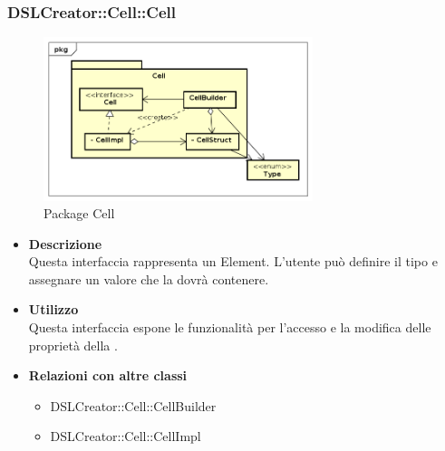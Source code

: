  \subsubsection{DSLCreator::Cell::Cell}
                 \begin{figure}[H]
                  \centering
                  \includegraphics[width=0.7\textwidth]{res/img/Cell.png}
                  \caption{Package Cell}
                  \label{fig:diagram_model}
                \end{figure}
                    \begin{itemize}
                        \item \textbf{Descrizione} \hfill \\
                            Questa interfaccia rappresenta un  Element. L'utente può definire il tipo e assegnare un valore che la  dovrà contenere.
                        \item \textbf{Utilizzo} \hfill \\
                            Questa interfaccia espone le funzionalità per l'accesso e la modifica delle proprietà della .
                        \item \textbf{Relazioni con altre classi}
                            \begin{itemize}
                              \item DSLCreator::Cell::CellBuilder
                              \item DSLCreator::Cell::CellImpl
                            \end{itemize}
                    \end{itemize}

